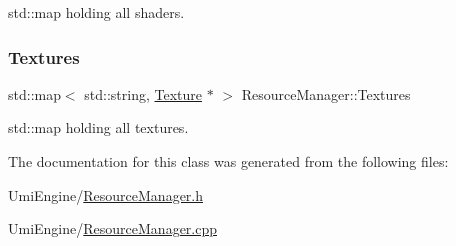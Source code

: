 std\+::map holding all shaders. 

\mbox{\label{class_resource_manager_a43a756e8e9ce85e0cf25946205749a9f}} 
\subsubsection{\texorpdfstring{Textures}{Textures}}
{\footnotesize\ttfamily std\+::map$<$ std\+::string, \mbox{\hyperlink{class_texture}{Texture}} $\ast$ $>$ Resource\+Manager\+::\+Textures\hspace{0.3cm}{\ttfamily [static]}}



std\+::map holding all textures. 



The documentation for this class was generated from the following files\+:\begin{DoxyCompactItemize}
\item 
Umi\+Engine/\mbox{\hyperlink{_resource_manager_8h}{Resource\+Manager.\+h}}\item 
Umi\+Engine/\mbox{\hyperlink{_resource_manager_8cpp}{Resource\+Manager.\+cpp}}\end{DoxyCompactItemize}
